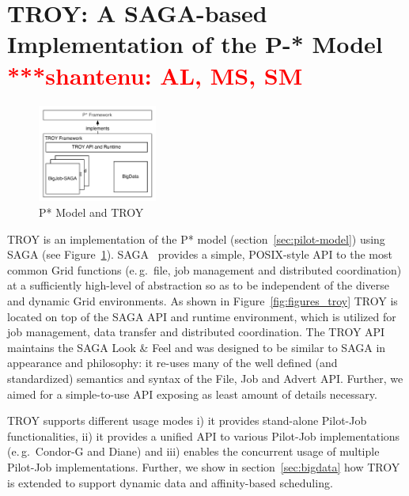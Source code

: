 \documentclass[conference,final]{IEEEtran}
\newcommand{\jhanote}[1]{ {\textcolor{red} { ***shantenu: #1 }}}
\newcommand{\msnote}[1]{ {\textcolor{cyan} { ***mark: #1 }}}
\newcommand{\jhanote}[1]{}
\newcommand{\msnote}[1]{}
\begin{document}
\section{TROY: A SAGA-based Implementation of the P-* Model
  \jhanote{AL, MS, SM}}



\begin{figure}[t]
	\centering
		\includegraphics[width=0.35\textwidth]{figures/pstar_troy.pdf}
	\caption{P* Model and TROY}
	\label{fig:figures_pstar_troy}
\end{figure}

TROY is an implementation of the P* model (section~\ref{sec:pilot-model}) using
SAGA (see Figure~\ref{fig:figures_pstar_troy}). SAGA~\cite{saga_url,saga_gfd90}
provides a simple, POSIX-style API to the most common Grid functions (e.\,g.\
file, job management and distributed coordination) at a sufficiently high-level
of abstraction so as to be independent of the diverse and dynamic Grid
environments. As shown in Figure~\ref{fig:figures_troy} TROY is located on top
of the SAGA API and runtime environment, which is utilized for job management,
data transfer and distributed coordination. The TROY API maintains the SAGA Look
\& Feel and was designed to be similar to SAGA in appearance and philosophy: it
re-uses many of the well defined (and standardized) semantics and syntax of the
File, Job and Advert API. Further, we aimed for a simple-to-use API exposing as
least amount of details necessary. 

TROY supports different usage modes i) it provides stand-alone
Pilot-Job functionalities, ii) it provides a unified API to various
Pilot-Job implementations (e.\,g.\ Condor-G and Diane) and iii)
enables the concurrent usage of multiple Pilot-Job
implementations. Further, we show in section~\ref{sec:bigdata} how
TROY is extended to support dynamic data and affinity-based
scheduling.
\end{document}

